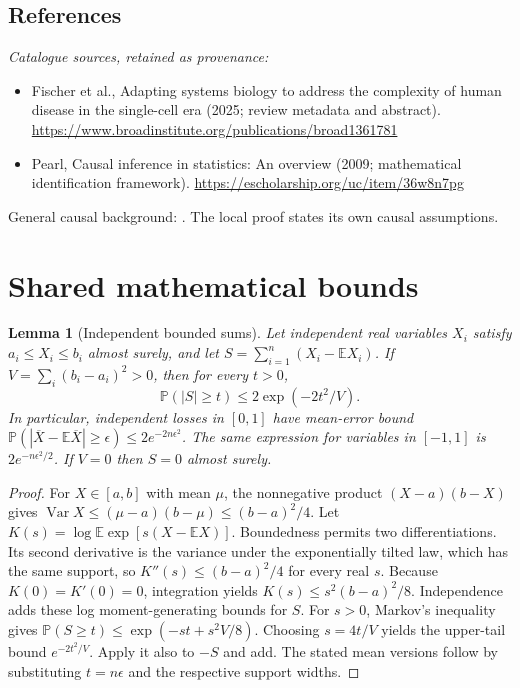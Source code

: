 \documentclass[11pt]{article}
\newcommand{\E}{\mathbb E}
\newcommand{\Prob}{\mathbb P}
\DeclareMathOperator{\Var}{Var}
\providecommand{\E}{\mathbb E}
\providecommand{\Prob}{\mathbb P}
\providecommand{\Var}{\operatorname{Var}}
\newtheorem{sharedlemma}{Lemma}[section]
\begin{document}
\subsection{References}
\noindent\emph{Catalogue sources, retained as provenance:}
\begin{itemize}
\item Fischer et al., Adapting systems biology to address the complexity of human disease in the single-cell era (2025; review metadata and abstract). \url{https://www.broadinstitute.org/publications/broad1361781}
\item Pearl, Causal inference in statistics: An overview (2009; mathematical identification framework). \url{https://escholarship.org/uc/item/36w8n7pg}
\end{itemize}
\noindent General causal background: \cite{pearl}. The local proof states its own causal assumptions.
\clearpage


\appendix
\section{Shared mathematical bounds}\label{app:bounds}
\begin{sharedlemma}[Independent bounded sums]\label{lem:bounded}
Let independent real variables $X_i$ satisfy $a_i\leq X_i\leq b_i$ almost surely,
and let $S=\sum_{i=1}^n(X_i-\E X_i)$. If
$V=\sum_i(b_i-a_i)^2>0$, then for every $t>0$,
\[
 \Prob(|S|\geq t)\leq 2\exp(-2t^2/V).
\]
In particular, independent losses in $[0,1]$ have mean-error bound
$\Prob(|\overline X-\E\overline X|\geq\epsilon)
\leq2e^{-2n\epsilon^2}$. The same expression for variables in $[-1,1]$
is $2e^{-n\epsilon^2/2}$. If $V=0$ then $S=0$ almost surely.
\end{sharedlemma}
\begin{proof}
For $X\in[a,b]$ with mean $\mu$, the nonnegative product
$(X-a)(b-X)$ gives
$\Var X\leq(\mu-a)(b-\mu)\leq(b-a)^2/4$.
Let $K(s)=\log\E\exp[s(X-\E X)]$.
Boundedness permits two differentiations. Its second derivative is the variance
under the exponentially tilted law, which has the same support, so
$K''(s)\leq(b-a)^2/4$ for every real $s$.
Because $K(0)=K'(0)=0$, integration yields
$K(s)\leq s^2(b-a)^2/8$.
Independence adds these log moment-generating bounds for $S$.
For $s>0$, Markov's inequality gives
$\Prob(S\geq t)\leq\exp(-st+s^2V/8)$.
Choosing $s=4t/V$ yields the upper-tail bound $e^{-2t^2/V}$.
Apply it also to $-S$ and add. The stated mean versions follow by substituting
$t=n\epsilon$ and the respective support widths.
\end{proof}
\end{document}
